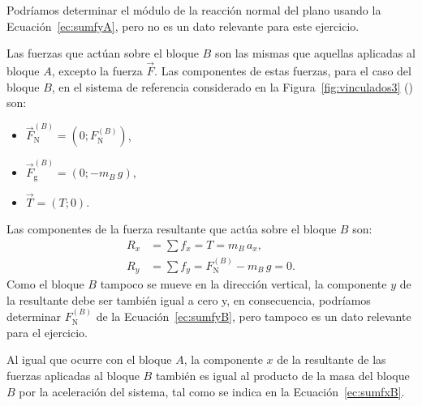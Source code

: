\documentclass[addpoints]{exam}
\begin{document}
\begin{questions}
\begin{solution}
        Podríamos determinar el módulo de la reacción normal del plano usando la Ecuación~\eqref{ec:sumfyA}, pero no es un dato relevante para este ejercicio.
        
        Las fuerzas que actúan sobre el bloque $B$ son las mismas que aquellas aplicadas al bloque $A$, excepto la fuerza $\vec{F}$. Las componentes de estas fuerzas, para el caso del bloque $B$, en el sistema de referencia considerado en la Figura~\ref{fig:vinculados3} () son:
        \begin{itemize}
            \item $\vec{F}_\text{N}^{(B)} = \left(0; F_\text{N}^{(B)}\right)$,
            \item $\vec{F}_\text{g}^{(B)} = \left(0; - m_B \, g\right)$,
            \item $\vec{T} = \left(T;0\right)$.
        \end{itemize} Las componentes de la fuerza resultante que actúa sobre el bloque $B$ son:
        \begin{align}
            R_x &= \sum f_x = T = m_B \, a_x, \label{ec:sumfxB} \\
            R_y &= \sum f_y = F_\text{N}^{(B)} - m_B \, g = 0. \label{ec:sumfyB}
        \end{align} Como el bloque $B$ tampoco se mueve en la dirección vertical, la componente $y$ de la resultante debe ser también igual a cero y, en consecuencia, podríamos determinar $F_\text{N}^{(B)}$ de la Ecuación~\eqref{ec:sumfyB}, pero tampoco es un dato relevante para el ejercicio.

        Al igual que ocurre con el bloque $A$, la componente $x$ de la resultante de las fuerzas aplicadas al bloque $B$ también es igual al producto de la masa del bloque $B$ por la aceleración del sistema, tal como se indica en la Ecuación~\eqref{ec:sumfxB}.


\end{solution}
\end{questions}
\end{document}
